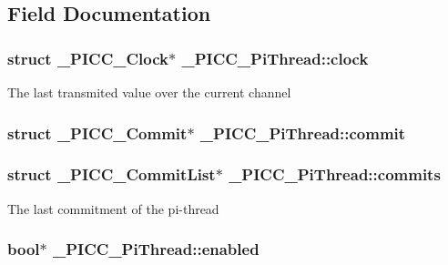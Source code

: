 \subsection{Field Documentation}
\hypertarget{struct__PICC__PiThread_a82e0d888275cbcc0e0995456f0b49e4e}{
\subsubsection[{clock}]{\setlength{\rightskip}{0pt plus 5cm}struct {\bf \-\_\-\-P\-I\-C\-C\-\_\-\-Clock}$\ast$ \-\_\-\-P\-I\-C\-C\-\_\-\-Pi\-Thread\-::clock}}\label{struct__PICC__PiThread_a82e0d888275cbcc0e0995456f0b49e4e}
The last transmited value over the current channel \hypertarget{struct__PICC__PiThread_a7fabb4c7acd615b20bdccd6ed32ff4f8}{
\subsubsection[{commit}]{\setlength{\rightskip}{0pt plus 5cm}struct {\bf \-\_\-\-P\-I\-C\-C\-\_\-\-Commit}$\ast$ \-\_\-\-P\-I\-C\-C\-\_\-\-Pi\-Thread\-::commit}}\label{struct__PICC__PiThread_a7fabb4c7acd615b20bdccd6ed32ff4f8}
\hypertarget{struct__PICC__PiThread_af9256cdd22994cccbe76e7ef530430f8}{
\subsubsection[{commits}]{\setlength{\rightskip}{0pt plus 5cm}struct {\bf \-\_\-\-P\-I\-C\-C\-\_\-\-Commit\-List}$\ast$ \-\_\-\-P\-I\-C\-C\-\_\-\-Pi\-Thread\-::commits}}\label{struct__PICC__PiThread_af9256cdd22994cccbe76e7ef530430f8}
The last commitment of the pi-\/thread \hypertarget{struct__PICC__PiThread_a1f2c99b2169bd58582a8b4320c2106a0}{
\subsubsection[{enabled}]{\setlength{\rightskip}{0pt plus 5cm}bool$\ast$ \-\_\-\-P\-I\-C\-C\-\_\-\-Pi\-Thread\-::enabled}}\label{struct__PICC__PiThread_a1f2c99b2169bd58582a8b4320c2106a0}
